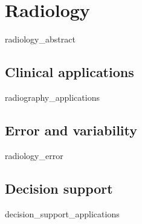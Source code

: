 \chapter{Radiology}
{radiology_abstract}
\clearpage


\section{Clinical applications}
{radiography_applications}
\clearpage

\section{Error and variability}
{radiology_error}
\clearpage


\section{Decision support}
{decision_support_applications}
\clearpage